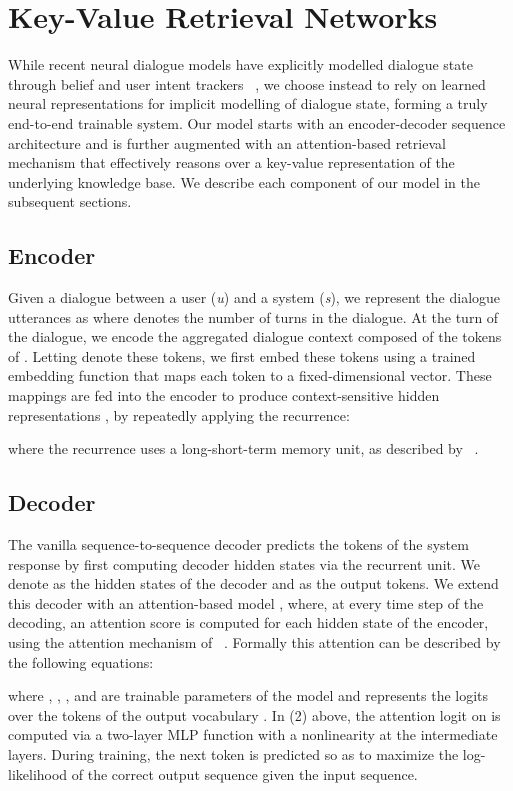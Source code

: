 \documentclass[11pt,a4paper]{article}
\begin{document}
\section{Key-Value Retrieval Networks}
  While recent neural dialogue models have explicitly modelled dialogue state through belief and user intent trackers ~\cite{Wen:16,Dhingra:16,Henderson:14b}, we choose instead to rely on learned neural representations for implicit modelling of dialogue state, forming a truly end-to-end trainable system. Our model starts with an encoder-decoder sequence architecture and is further augmented with an attention-based retrieval mechanism that effectively reasons over a key-value representation of the underlying knowledge base. We describe each component of our model in the subsequent sections.


\subsection{Encoder}
  Given a dialogue between a user (\emph{u}) and a system (\emph{s}), we represent the dialogue utterances as  where  denotes the number of turns in the dialogue. At the  turn of the dialogue,
we encode the aggregated dialogue context composed of the tokens of . Letting  denote these tokens,
we first embed these tokens using a trained embedding function  that maps each token to a fixed-dimensional vector. These mappings are fed into the encoder to produce context-sensitive hidden representations , by repeatedly applying the recurrence:
  
  where the recurrence uses a long-short-term memory unit, as described by ~\cite{Hochreiter:97}.
 

\subsection{Decoder}

The vanilla sequence-to-sequence decoder predicts the tokens of the  system response  by first computing decoder hidden states via the recurrent unit. We denote  as the hidden states of the decoder and  as the output tokens.  We extend this decoder with an attention-based model \cite{Bahdanau:14,Luong:15a}, where, at every time step  of the decoding, an attention score  is computed for each hidden state  of the encoder, using the attention mechanism of ~\cite{NIPS2015_5635}. Formally this attention can be described by the following equations:
    

  \noindent where , , , and  are trainable parameters of the model and  represents the logits over the tokens of the output vocabulary . In (2) above, the attention logit on  is computed via a two-layer MLP function with a  nonlinearity at the intermediate layers.  During training, the next token  is predicted so as to maximize the log-likelihood of the correct output sequence given the input sequence.
\end{document}
